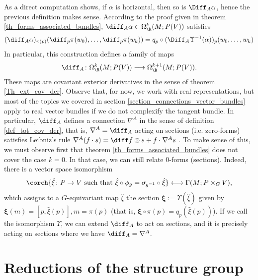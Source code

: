As a direct computation shows, if \(\alpha\) is horizontal, then so is \(\Diff_A\alpha\), hence the previous definition makes sense. According to the proof given in theorem \ref{th_forms_associated_bundles}, \(\diff_A \alpha \in \Omega^k_\R(M;P(V))\) satisfies
\begin{equation} \label{eq_def_cov_der_induced}
(\diff_A \alpha)_{\pi(p)}(\diff_p\pi(w_0), \ldots, \diff_p\pi(w_{k}))=q_p\circ (\Diff_A\Upsilon^{-1}(\alpha))_p(w_0, \ldots, w_{k})
\end{equation}
In particular, this construction defines a family of maps 
\[
\diff_A\colon \Omega^k_\R(M;P(V))\longrightarrow \Omega^{k+1}_\R(M;P(V)).
\]
These maps are covariant exterior derivatives in the sense of theorem \ref{Th_ext_cov_der}. Observe that, for now, we work with real representations, but most of the topics we covered in section \ref{section_connections_vector_bundles} apply to real vector bundles if we do not complexify the tangent bundle. In particular, \(\diff_A\) defines a connection \(\nabla^A\) in the sense of definition \ref{def_tot_cov_der}, that is, \(\nabla^A=\diff_A\) acting on sections (i.e. zero-forms) satisfies Leibniz's rule \(\nabla^A(f\cdot s)=\diff f \otimes s+f\cdot \nabla^A s\) \parencite[Prop. 1.5.4]{Rudolph_2017pug}. To make sense of this, we must observe first that theorem \ref{th_forms_associated_bundles} does not cover the case \(k=0\). In that case, we can still relate \(0\)-forms (sections). Indeed, there is a vector space isomorphism \parencite[Prop. 1.2.6]{Rudolph_2017pug}
\begin{equation} \label{eq_bijec_G_eqiva_sections}
\corch{\hat{\xi}\colon P \to V \text{ such that } \hat{\xi}\circ \phi_g=\sigma_{g^{-1}}\circ \hat{\xi}} \longleftrightarrow \Gamma(M; P \times_G V),
\end{equation}
which assigns to a \(G\)-equivariant map \(\hat{\xi}\) the section \(\bm{\xi}:=\Upsilon(\hat{\xi})\) given by \(\bm{\xi}(m)=[p,\hat{\xi}(p)], m=\pi(p)\) (that is, \(\bm{\xi} \circ \pi(p) = q_p(\hat{\xi}(p))\)). If we call the isomorphism \(\Upsilon\), we can extend \(\diff_A\) to act on sections, and it is precisely acting on sections where we have \(\diff_A=\nabla^A\).

\section{Reductions of the structure group} \label{sec_reductions_structure_group}

